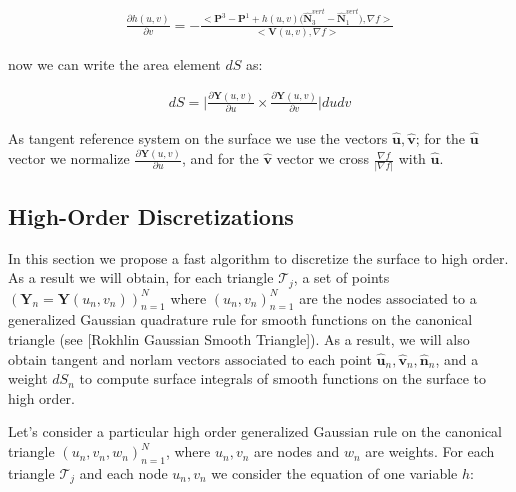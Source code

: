 \documentclass[11pt]{article}
\newcommand\bn{\boldsymbol n}
\newcommand\bP{\boldsymbol P}
\newcommand\bN{\boldsymbol N}
\newcommand\bY{\boldsymbol Y}
\newcommand\bV{\boldsymbol V}
\newcommand\bu{\boldsymbol u}
\newcommand\bv{\boldsymbol v}
\begin{document}
\begin{equation}\label{V_vector_2}
\begin{aligned}
\frac{\partial h(u,v)}{\partial v}=-\frac{<\bP^3-\bP^1+h(u,v)\Big(\hat{\bN}^{vert}_3-\hat{\bN}^{vert}_1\Big),\nabla f>}{<\bV(u,v),\nabla f>}
\end{aligned}
\end{equation}


now we can write the area element $dS$ as:

\begin{equation}\label{dS}
\begin{aligned}
 dS=\Bigg|\frac{\partial\bY(u,v)}{\partial u}\times\frac{\partial\bY(u,v)}{\partial v}\Bigg|dudv
\end{aligned}
\end{equation}
  
 
 
As tangent reference system on the surface we use the vectors $\hat{\bu}, \hat{\bv}$; for the  $\hat{\bu}$ vector we normalize $\frac{\partial\bY(u,v)}{\partial u}$, and for the $\hat{\bv}$ vector we cross $\frac{\nabla f}{|\nabla f|}$ with $\hat{\bu}$.




\subsection{High-Order Discretizations}
\label{sec:disc}




In this section we propose a fast algorithm to discretize the surface to high order. As a result we will obtain, for each triangle $\mathcal{T}_j$, a set of points $(\bY_n=\bY(u_n,v_n))_{n=1}^N$ where $(u_n,v_n)_{n=1}^N$ are the nodes associated to a generalized Gaussian quadrature rule for smooth functions on the canonical triangle (see [Rokhlin Gaussian Smooth Triangle]). As a result, we will also obtain tangent and norlam vectors associated to each point $\hat{\bu}_n,\hat{\bv}_n,\hat{\bn}_n$, and a weight $dS_n$ to compute surface integrals of smooth functions on the surface to high order.

Let's consider a particular high order generalized Gaussian rule on the canonical triangle $(u_n,v_n,w_n)_{n=1}^N$, where $u_n,v_n$ are nodes and $w_n$ are weights. For each triangle $\mathcal{T}_j$ and each node $u_n,v_n$ we consider the equation of one variable $h$:
\end{document}
